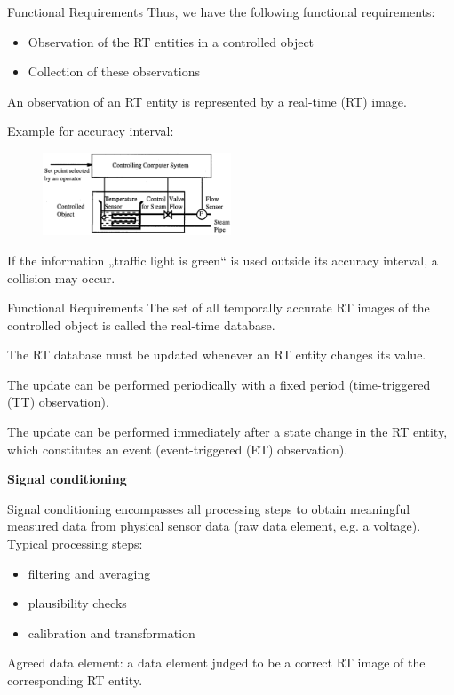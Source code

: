 \begin{frame}{Functional Requirements}
Thus, we have the following functional requirements:

\begin{itemize}
\item
  Observation of the RT entities in a controlled object
\item
  Collection of these observations
\end{itemize}

An observation of an RT entity is represented by a real-time (RT) image.

Example for accuracy interval:

\begin{figure}
\includegraphics[width=0.5\textwidth]{media/Fig_1_3.png}
\end{figure}

If the information „traffic light is green`` is used outside its
accuracy interval, a collision may occur.

\end{frame}

\begin{frame}{Functional Requirements}
The set of all temporally accurate RT images of the controlled object is
called the real-time database.

The RT database must be updated whenever an RT entity changes its value.

The update can be performed periodically with a fixed period
(time-triggered (TT) observation).

The update can be performed immediately after a state change in the RT
entity, which constitutes an event (event-triggered (ET) observation).

\textbf{Signal conditioning}

Signal conditioning encompasses all processing steps to obtain
meaningful measured data from physical sensor data (raw data element,
e.g. a voltage). Typical processing steps:

\begin{itemize}
\item
  filtering and averaging
\item
  plausibility checks
\item
  calibration and transformation
\end{itemize}

Agreed data element: a data element judged to be a correct RT image of
the corresponding RT entity.

\end{frame}

